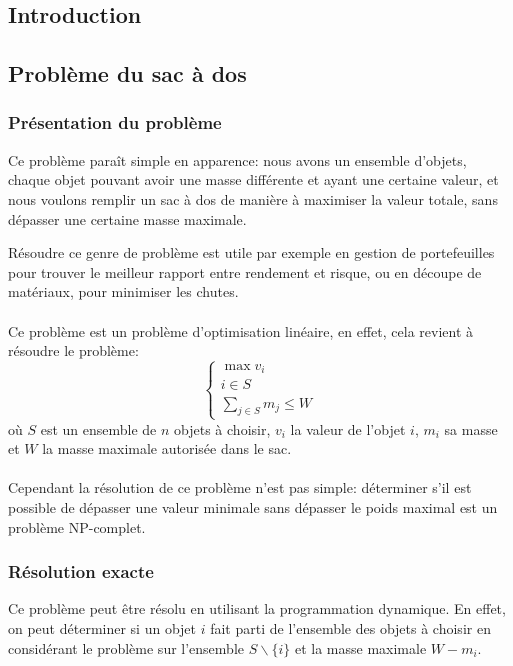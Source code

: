 \subsection{Introduction}
  \todo

\subsection{Problème du sac à dos}
  \subsubsection{Présentation du problème}
    Ce problème paraît simple en apparence: nous avons un ensemble d'objets,
    chaque objet pouvant avoir une masse différente et ayant une certaine
    valeur, et nous voulons remplir un sac à dos de manière à maximiser la
    valeur totale, sans dépasser une certaine masse maximale.

    Résoudre ce genre de problème est utile par exemple en gestion de
    portefeuilles pour trouver le meilleur rapport entre rendement et risque,
    ou en découpe de matériaux, pour minimiser les chutes.

    \paragraph{}
    Ce problème est un problème d'optimisation linéaire, en effet, cela revient
    à résoudre le problème:
    \[ \left\{ \begin{array}{l}
        \max v_i \\
        i \in S \\
        \displaystyle\sum_{j \in S} m_j \leq W
      \end{array} \right.
    \]
    où $S$ est un ensemble de $n$ objets à choisir, $v_i$ la valeur de l'objet
    $i$, $m_i$ sa masse et $W$ la masse maximale autorisée dans le sac.

    \paragraph{}
    Cependant la résolution de ce problème n'est pas simple: déterminer s'il
    est possible de dépasser une valeur minimale sans dépasser le poids maximal
    est un problème NP\nobreakdash-complet.

  \subsubsection{Résolution exacte}
    Ce problème peut être résolu en utilisant la programmation dynamique. En
    effet, on peut déterminer si un objet $i$ fait parti de l'ensemble des
    objets à choisir en considérant le problème sur l'ensemble
    $S\backslash\{i\}$ et la masse maximale $W-m_i$.
    
